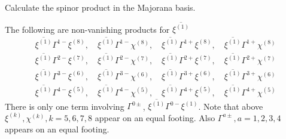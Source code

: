
\begin{correct}
	Calculate the spinor product in the Majorana basis.
\end{correct}

The following are non-vanishing products for $\overline{\xi^{(1)}}$
\begin{gather*}
	\overline{\xi^{(1)}} \Gamma^{1-} \xi^{(8)},\quad
	\overline{\xi^{(1)}} \Gamma^{1-} \chi^{(8)},\quad
	\overline{\xi^{(1)}} \Gamma^{1+} \xi^{(8)},\quad
	\overline{\xi^{(1)}} \Gamma^{1+} \chi^{(8)} \\
	\overline{\xi^{(1)}} \Gamma^{2-} \xi^{(7)},\quad
	\overline{\xi^{(1)}} \Gamma^{2-} \chi^{(7)},\quad
	\overline{\xi^{(1)}} \Gamma^{2+} \xi^{(7)},\quad
	\overline{\xi^{(1)}} \Gamma^{2+} \chi^{(7)}\\
	\overline{\xi^{(1)}} \Gamma^{3-} \xi^{(6)},\quad
	\overline{\xi^{(1)}} \Gamma^{3-} \chi^{(6)},\quad
	\overline{\xi^{(1)}} \Gamma^{3+} \xi^{(6)},\quad
	\overline{\xi^{(1)}} \Gamma^{3+} \chi^{(6)}\\
	\overline{\xi^{(1)}} \Gamma^{4-} \xi^{(5)},\quad
	\overline{\xi^{(1)}} \Gamma^{4-} \chi^{(5)},\quad
	\overline{\xi^{(1)}} \Gamma^{4+} \xi^{(5)},\quad
	\overline{\xi^{(1)}} \Gamma^{4+} \chi^{(5)}
\end{gather*}
There is only one term involving $\Gamma^{0\pm}$,
$\overline{\xi^{(1)}} \Gamma^{0-} \xi^{(1)}$.
Note that above $\xi^{(k)},\chi^{(k)},k=5,6,7,8$ appear on an equal footing.
Also $\Gamma^{a\pm},a=1,2,3,4$ appears on an equal footing.

